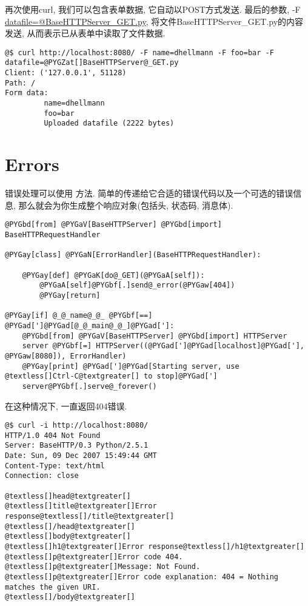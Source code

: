 \documentclass[a4paper,10pt,english]{manual}
\begin{document}
再次使用curl, 我们可以包含表单数据, 它自动以POST方式发送. 最后的参数, -F \href{mailto:datafile=@BaseHTTPServer\_GET.py}{datafile=@BaseHTTPServer\_GET.py}, 将文件BaseHTTPServer\_GET.py的内容发送, 从而表示已从表单中读取了文件数据.

\begin{Verbatim}[commandchars=@\[\]]
@$ curl http://localhost:8080/ -F name=dhellmann -F foo=bar -F datafile=@PYGZat[]BaseHTTPServer@_GET.py
Client: ('127.0.0.1', 51128)
Path: /
Form data:
         name=dhellmann
         foo=bar
         Uploaded datafile (2222 bytes)
\end{Verbatim}


\section{Errors}

错误处理可以使用  方法. 简单的传递给它合适的错误代码以及一个可选的错误信息, 那么就会为你生成整个响应对象(包括头, 状态码, 消息体).

\begin{Verbatim}[commandchars=@\[\]]
@PYGbd[from] @PYGaV[BaseHTTPServer] @PYGbd[import] BaseHTTPRequestHandler

@PYGay[class] @PYGaN[ErrorHandler](BaseHTTPRequestHandler):

    @PYGay[def] @PYGaK[do@_GET](@PYGaA[self]):
        @PYGaA[self]@PYGbf[.]send@_error(@PYGaw[404])
        @PYGay[return]

@PYGay[if] @_@_name@_@_ @PYGbf[==] @PYGad[']@PYGad[@_@_main@_@_]@PYGad[']:
    @PYGbd[from] @PYGaV[BaseHTTPServer] @PYGbd[import] HTTPServer
    server @PYGbf[=] HTTPServer((@PYGad[']@PYGad[localhost]@PYGad['], @PYGaw[8080]), ErrorHandler)
    @PYGay[print] @PYGad[']@PYGad[Starting server, use @textless[]Ctrl-C@textgreater[] to stop]@PYGad[']
    server@PYGbf[.]serve@_forever()
\end{Verbatim}

在这种情况下, 一直返回404错误.

\begin{Verbatim}[commandchars=@\[\]]
@$ curl -i http://localhost:8080/
HTTP/1.0 404 Not Found
Server: BaseHTTP/0.3 Python/2.5.1
Date: Sun, 09 Dec 2007 15:49:44 GMT
Content-Type: text/html
Connection: close

@textless[]head@textgreater[]
@textless[]title@textgreater[]Error response@textless[]/title@textgreater[]
@textless[]/head@textgreater[]
@textless[]body@textgreater[]
@textless[]h1@textgreater[]Error response@textless[]/h1@textgreater[]
@textless[]p@textgreater[]Error code 404.
@textless[]p@textgreater[]Message: Not Found.
@textless[]p@textgreater[]Error code explanation: 404 = Nothing matches the given URI.
@textless[]/body@textgreater[]
\end{Verbatim}
\end{document}
